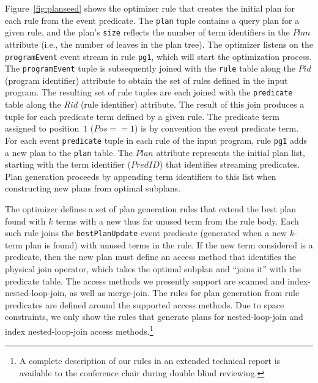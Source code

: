 \documentclass{sigmod08}
\newcommand{\ol}[1]{\texttt{\small #1}\xspace}
\begin{document}
Figure~\ref{fig:planseed} shows the optimizer rule  that creates
the initial plan for each rule from the event predicate. The \ol{plan} tuple
contains a query plan for a given rule, and the plan's \ol{size} reflects the number of
term identifiers in the $Plan$ attribute (i.e., the number of leaves in the plan tree). The optimizer listens on the \ol{programEvent} event stream in
rule \ol{pg1}, which will start the optimization process.  
The \ol{programEvent} tuple is subsequently joined with the \ol{rule} table along the 
$Pid$ (program identifier) attribute to obtain the set of rules defined in the input program. 
The resulting set of rule tuples are each joined with the \ol{predicate} table along the 
$Rid$ (rule identifier) attribute. The result of this join produces a tuple for each predicate term 
defined by a given rule. The predicate term assigned to position~$1$ ($Pos == 1$) is
by convention the event predicate term.  For each 
event \ol{predicate} tuple in each rule of the input program, rule \ol{pg1} adds a new 
plan to the \ol{plan} table. The $Plan$ attribute represents the initial plan list,
starting with the term identifier ($PredID$) that identifies streaming predicates.
Plan generation proceeds by appending term identifiers to this list when
constructing new plans from optimal subplans.

The optimizer defines a set of plan generation rules that extend the
best plan found with $k$ terms with a new thus far unused term from the
rule body. Each such rule joins the \ol{bestPlanUpdate} event predicate
(generated when a new $k$-term plan is found) with unused terms in the
rule. If the new term considered is a predicate, then the new plan
must define an access method
that identifies the physical join operator, which
takes the optimal subplan and ``joins it'' with the predicate table. The access methods we presently 
support are scanned and index-nested-loop-join, as well as merge-join. 
The rules for plan generation from rule predicates are defined around the supported access methods. 
Due to space constraints, we only show the rules that generate plans for nested-loop-join 
and index nested-loop-join access methods.\footnote{A complete description of our rules 
in an extended technical report is available to the conference chair
during double blind reviewing.}
\end{document}
